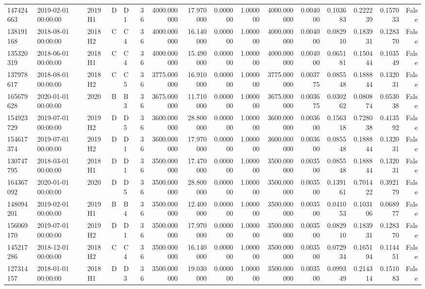 \begin{tabular}{lllllrrrrrrrrrrr}
147424663 & 2019-02-01 00:00:00 & 2019H1 & D & D1 & 36 & 4000.000000 & 17.970000 & 0.000000 & 1.000000 & 4000.000000 & 0.004000 & 0.103683 & 0.222239 & 0.157033 & False \\
138191168 & 2018-08-01 00:00:00 & 2018H2 & C & C4 & 36 & 4000.000000 & 16.140000 & 0.000000 & 1.000000 & 4000.000000 & 0.004000 & 0.082910 & 0.183931 & 0.128370 & False \\
135320319 & 2018-06-01 00:00:00 & 2018H1 & C & C4 & 36 & 4000.000000 & 15.490000 & 0.000000 & 1.000000 & 4000.000000 & 0.004000 & 0.065181 & 0.150444 & 0.103549 & False \\
137978617 & 2018-08-01 00:00:00 & 2018H2 & C & C5 & 36 & 3775.000000 & 16.910000 & 0.000000 & 1.000000 & 3775.000000 & 0.003775 & 0.085548 & 0.188844 & 0.132031 & False \\
165679628 & 2020-01-01 00:00:00 & 2020 & B & B3 & 36 & 3675.000000 & 11.710000 & 0.000000 & 1.000000 & 3675.000000 & 0.003675 & 0.030262 & 0.080874 & 0.053038 & False \\
154923729 & 2019-07-01 00:00:00 & 2019H2 & D & D5 & 36 & 3600.000000 & 28.800000 & 0.000000 & 1.000000 & 3600.000000 & 0.003600 & 0.156318 & 0.728038 & 0.413592 & False \\
154617374 & 2019-07-01 00:00:00 & 2019H2 & D & D1 & 36 & 3600.000000 & 17.970000 & 0.000000 & 1.000000 & 3600.000000 & 0.003600 & 0.085548 & 0.188844 & 0.132031 & False \\
130747795 & 2018-03-01 00:00:00 & 2018H1 & D & D1 & 36 & 3500.000000 & 17.470000 & 0.000000 & 1.000000 & 3500.000000 & 0.003500 & 0.085548 & 0.188844 & 0.132031 & False \\
164367092 & 2020-01-01 00:00:00 & 2020 & D & D5 & 36 & 3500.000000 & 28.800000 & 0.000000 & 1.000000 & 3500.000000 & 0.003500 & 0.139161 & 0.701422 & 0.392179 & False \\
148094201 & 2019-02-01 00:00:00 & 2019H1 & B & B4 & 36 & 3500.000000 & 12.400000 & 0.000000 & 1.000000 & 3500.000000 & 0.003500 & 0.041053 & 0.103106 & 0.068977 & False \\
156069170 & 2019-07-01 00:00:00 & 2019H2 & D & D1 & 36 & 3500.000000 & 17.970000 & 0.000000 & 1.000000 & 3500.000000 & 0.003500 & 0.082910 & 0.183931 & 0.128370 & False \\
145217286 & 2018-12-01 00:00:00 & 2018H2 & C & C4 & 36 & 3500.000000 & 16.140000 & 0.000000 & 1.000000 & 3500.000000 & 0.003500 & 0.072934 & 0.165194 & 0.114451 & False \\
127314157 & 2018-01-01 00:00:00 & 2018H1 & D & D3 & 36 & 3500.000000 & 19.030000 & 0.000000 & 1.000000 & 3500.000000 & 0.003500 & 0.099349 & 0.214314 & 0.151083 & False \\

\end{tabular}

